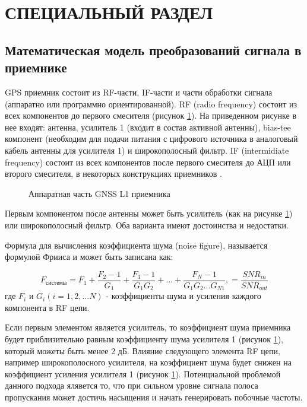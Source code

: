 \section{СПЕЦИАЛЬНЫЙ РАЗДЕЛ}

\subsection{Математическая модель преобразований сигнала в приемнике}
GPS приемник состоит из RF-части, IF-части и части обработки сигнала (аппаратно или программно ориентированной). RF (radio frequency)
состоит из всех компонентов до первого смесителя (рисунок \ref{pic:hw_receiver}). На приведенном рисунке в нее входят: антенна,
усилитель 1 (входит в состав активной антенны), bias-tee компонент (необходим для подачи питания с цифрового источника в аналоговый
кабель антенны для усилителя 1) и широкополосный фильтр. IF (intermidiate frequency) состоит из всех компонентов после первого
смесителя до АЦП или второго смесителя, в некоторых конструкциях приемников \cite{gps}.

\begin{figure}[H]
\begin{center}
\end{center}
\caption{Аппаратная часть GNSS L1 приемника}
\label{pic:hw_receiver}
\end{figure}

Первым компонентом после антенны может быть усилитель (как на рисунке \ref{pic:hw_receiver}) или широкополосный фильтр. Оба
варианта имеют достоинства и недостатки.

Формула для вычисления коэффициента шума (noise figure), называется формулой Фрииса \cite{boyd} и может быть записана как:

\begin{equation}
F_{\mbox{системы}} = 
			F_1 + \frac{F_2 - 1}{G_1} + \frac{F_3 - 1}{G_1 G_2} + ... + \frac{F_N - 1}{G_1 G_2 ... G_{N1}},
		   =
			\frac{SNR_{in}}{SNR_{out}}
\label{eq:friis}
\end{equation}
где ${F_i}$ и ${G_i (i=1,2,...N)}$ - коэффициенты шума и усиления каждого компонента в RF цепи.

Если первым элементом является усилитель, то коэффициент шума приемника будет приблизительно равным коэффициенту шума
усилителя 1 (рисунок \ref{pic:hw_receiver}), который можеты быть менее 2 дБ. Влияние следующего элемента RF цепи, например 
широкополосного усилителя, на коэффициент шума будет снижен на коэффициент усиления усилителя 1 (рисунок \ref{pic:hw_receiver}).
Потенциальной проблемой данного подхода ялявется то, что при сильном уровне сигнала полоса пропускания может достичь насыщения
и начать генерировать побочные частоты.

